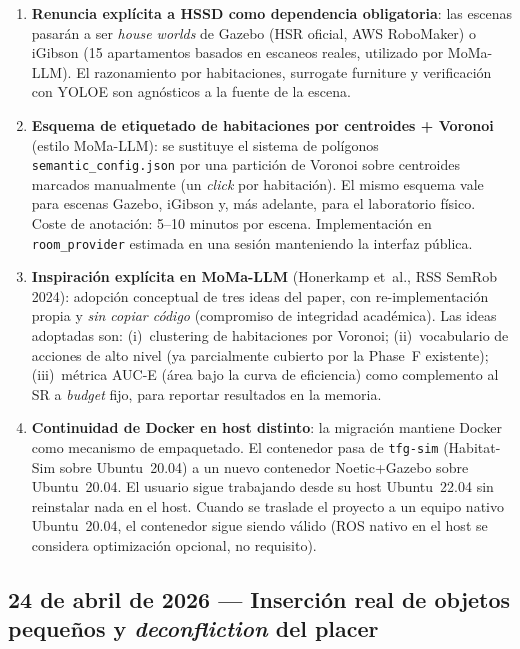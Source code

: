 \documentclass[11pt,a4paper]{article}
\begin{document}
\begin{enumerate}
  \item \textbf{Renuncia explícita a HSSD como dependencia obligatoria}: las
        escenas pasarán a ser \emph{house worlds} de Gazebo (HSR oficial,
        AWS RoboMaker) o iGibson (15 apartamentos basados en escaneos reales,
        utilizado por MoMa-LLM). El razonamiento por habitaciones, surrogate
        furniture y verificación con YOLOE son agnósticos a la fuente de la
        escena.

  \item \textbf{Esquema de etiquetado de habitaciones por centroides
        + Voronoi} (estilo MoMa-LLM): se sustituye el sistema de polígonos
        \texttt{semantic\_config.json} por una partición de Voronoi sobre
        centroides marcados manualmente (un \emph{click} por habitación). El
        mismo esquema vale para escenas Gazebo, iGibson y, más adelante, para
        el laboratorio físico. Coste de anotación: 5--10 minutos por escena.
        Implementación en \texttt{room\_provider} estimada en una sesión
        manteniendo la interfaz pública.

  \item \textbf{Inspiración explícita en MoMa-LLM} (Honerkamp et~al.,
        RSS SemRob 2024): adopción conceptual de tres ideas del paper, con
        re-implementación propia y \emph{sin copiar código} (compromiso de
        integridad académica). Las ideas adoptadas son: (i)~clustering de
        habitaciones por Voronoi; (ii)~vocabulario de acciones de alto nivel
        (ya parcialmente cubierto por la Phase~F existente); (iii)~métrica
        AUC-E (área bajo la curva de eficiencia) como complemento al SR a
        \emph{budget} fijo, para reportar resultados en la memoria.

  \item \textbf{Continuidad de Docker en host distinto}: la migración mantiene
        Docker como mecanismo de empaquetado. El contenedor pasa de
        \texttt{tfg-sim} (Habitat-Sim sobre Ubuntu~20.04) a un nuevo contenedor
        Noetic+Gazebo sobre Ubuntu~20.04. El usuario sigue trabajando desde su
        host Ubuntu~22.04 sin reinstalar nada en el host. Cuando se traslade el
        proyecto a un equipo nativo Ubuntu~20.04, el contenedor sigue siendo
        válido (ROS nativo en el host se considera optimización opcional, no
        requisito).

\end{enumerate}

\subsection*{24 de abril de 2026 --- Inserción real de objetos pequeños y \emph{deconfliction} del placer}
\end{document}
